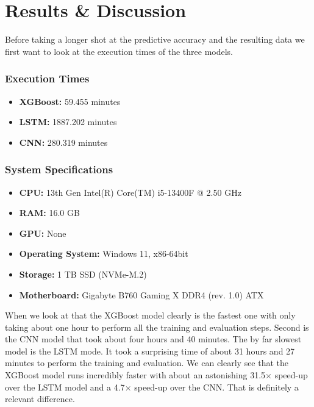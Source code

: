 \documentclass[a4paper,12pt]{report}
\begin{document}
\chapter{Results \& Discussion}
Before taking a longer shot at the predictive accuracy and the resulting data we first want to look at the execution times of the three models.\\

\subsection*{Execution Times}
\begin{itemize}
  \item \textbf{XGBoost:} 59.455 minutes
  \item \textbf{LSTM:} 1887.202 minutes
  \item \textbf{CNN:} 280.319 minutes
\end{itemize}

\subsection*{System Specifications}
\begin{itemize}
  \item \textbf{CPU:} 13th Gen Intel(R) Core(TM) i5-13400F @ 2.50 GHz
  \item \textbf{RAM:} 16.0 GB
  \item \textbf{GPU:} None
  \item \textbf{Operating System:} Windows 11, x86-64bit
  \item \textbf{Storage:} 1 TB SSD (NVMe-M.2)
  \item \textbf{Motherboard:} Gigabyte B760 Gaming X DDR4 (rev. 1.0) ATX
\end{itemize}

When we look at that the XGBoost model clearly is the fastest one with only taking about one hour to perform all the training and evaluation steps. Second is the CNN model that took about four hours and 40 minutes. The by far slowest model is the LSTM mode. It took a surprising time of about 31 hours and 27 minutes to perform the training and evaluation. We can clearly see that the XGBoost model runs incredibly faster with about an astonishing 31.5$\times$ speed-up over the LSTM model and a 4.7$\times$ speed-up over the CNN. That is definitely a relevant difference.\\


\newpage
\end{document}
